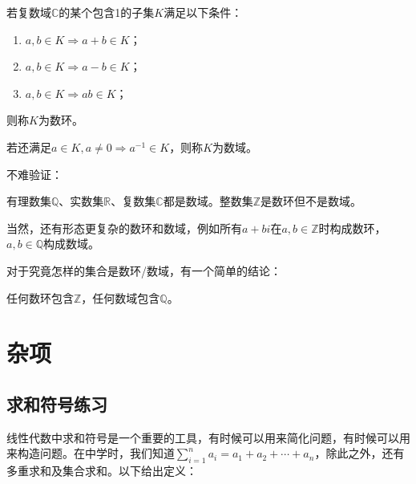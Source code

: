             \begin{definition}[数环、数域]
                若复数域$\mathbb{C}$的某个包含1的子集$K$满足以下条件：
                \begin{enumerate}
                    \item $a,b\in K\Rightarrow a+b\in K$；
                    \item $a,b\in K\Rightarrow a-b\in K$；
                    \item $a,b\in K\Rightarrow ab\in K$；
                \end{enumerate}
                则称$K$为数环。

                若还满足$a\in K, a \neq 0\Rightarrow a^{-1}\in K$，则称$K$为数域。
            \end{definition}

            不难验证：

            \begin{proposition}[数环、数域-例子]
                有理数集$\mathbb{Q}$、实数集$\mathbb{R}$、复数集$\mathbb{C}$都是数域。整数集$\mathbb{Z}$是数环但不是数域。
            \end{proposition}

            \begin{note}
                当然，还有形态更复杂的数环和数域，例如所有$a+bi$在$a,b\in\mathbb{Z}$时构成数环，$a,b\in\mathbb{Q}$构成数域。
            \end{note}

            对于究竟怎样的集合是数环/数域，有一个简单的结论：

            \begin{proposition}[最小的数环、数域]
                任何数环包含$\mathbb{Z}$，任何数域包含$\mathbb{Q}$。
            \end{proposition}

    \section{杂项}

        \subsection{求和符号练习}

        线性代数中求和符号是一个重要的工具，有时候可以用来简化问题，有时候可以用来构造问题。在中学时，我们知道$\sum\limits_{i=1}^{n}a_i=a_1+a_2+\cdots+a_n$，除此之外，还有多重求和及集合求和。以下给出定义：

